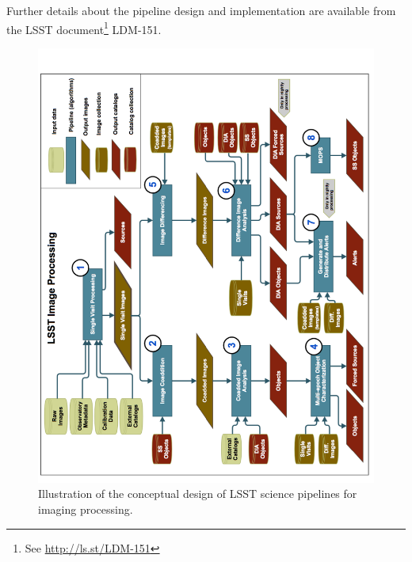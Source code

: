 \documentclass[12pt]{article}
\begin{document}
Further details about the pipeline design and implementation are available from the LSST
document\footnote{See \url{http://ls.st/LDM-151}} LDM-151\nocite{LDM-151}.

\begin{figure}[!t]
    \centering
    \vskip -0.1in
    \includegraphics[scale=0.515, angle=270]{gliffy/LSSTimageProcessingDetail1}
    \vskip -0.1in
    \caption{Illustration of the conceptual design of LSST science pipelines for imaging processing.\label{fig:Detail1}}
\end{figure}
\end{document}
